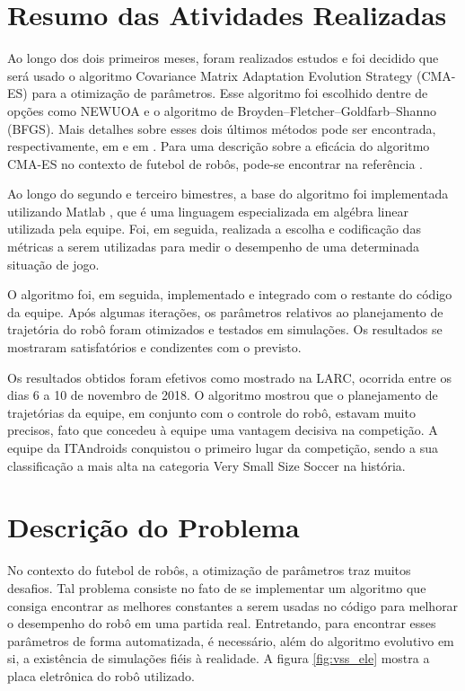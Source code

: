 \documentclass[a4paper,12pt]{article}
\begin{document}
\section{Resumo das Atividades Realizadas}
\label{secao:atividades_realizadas}

Ao longo dos dois primeiros meses, foram realizados estudos e foi decidido que será usado o algoritmo Covariance Matrix Adaptation Evolution Strategy (CMA-ES) para a otimização de parâmetros. Esse algoritmo foi escolhido dentre de opções como NEWUOA e o algoritmo de Broyden–Fletcher–Goldfarb–Shanno (BFGS). Mais detalhes sobre esses dois últimos métodos pode ser encontrada, respectivamente, em \cite{NEWUOA} e em \cite{BFGS}. Para uma descrição sobre a eficácia do algoritmo CMA-ES no contexto de futebol de robôs, pode-se encontrar na referência \cite{CMA-ES}.

Ao longo do segundo e terceiro bimestres, a base do algoritmo foi implementada utilizando Matlab \cite{matlab}, que é uma linguagem especializada em algébra linear utilizada pela equipe. Foi, em seguida, realizada a escolha e codificação das métricas a serem utilizadas para medir o desempenho de uma determinada situação de jogo.

O algoritmo foi, em seguida, implementado e integrado com o restante do código da equipe. Após algumas iterações, os parâmetros relativos ao planejamento de trajetória do robô foram otimizados e testados em simulações. Os resultados se mostraram satisfatórios e condizentes com o previsto.

Os resultados obtidos foram efetivos como mostrado na LARC, ocorrida entre os dias 6 a 10 de novembro de 2018. O algoritmo mostrou que o planejamento de trajetórias da equipe, em conjunto com o controle do robô, estavam muito precisos, fato que concedeu à equipe uma vantagem decisiva na competição. A equipe da ITAndroids conquistou o primeiro lugar da competição, sendo a sua classificação a mais alta  na categoria Very Small Size Soccer na história.

\section{Descrição do Problema}
\label{secao:enunciado_problema}

No contexto do futebol de robôs, a otimização de parâmetros traz muitos desafios. Tal problema consiste no fato de se implementar um algoritmo que consiga encontrar as melhores constantes a serem usadas no código para melhorar o desempenho do robô em uma partida real. Entretando, para encontrar esses parâmetros de forma automatizada, é necessário, além do algoritmo evolutivo em si, a existência de simulações fiéis à realidade. A figura \ref{fig:vss_ele} mostra a placa eletrônica do robô utilizado.
\end{document}
